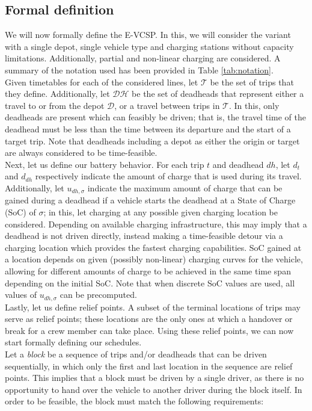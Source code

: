 \documentclass[]{article}
\begin{document}
\subsection{Formal definition}
We will now formally define the E-VCSP. In this, we will consider the variant with a single depot, single vehicle type and charging stations without capacity limitations. Additionally, partial and non-linear charging are considered. A summary of the notation used has been provided in Table \ref{tab:notation}. \\
Given timetables for each of the considered lines, let $\mathcal{T}$ be the set of trips that they define. Additionally, let $\mathcal{DH}$ be the set of deadheads that represent either a travel to or from the depot $\mathcal{D}$, or a travel between trips in $\mathcal{T}$. In this, only deadheads are present which can feasibly be driven; that is, the travel time of the deadhead must be less than the time between its departure and the start of a target trip. Note that deadheads including a depot as either the origin or target are always considered to be time-feasible. \\ 
Next, let us define our battery behavior. For each trip $t$ and deadhead $dh$, let $d_t$ and $d_{dh}$ respectively indicate the amount of charge that is used during its travel. Additionally, let $u_{dh,\sigma}$ indicate the maximum amount of charge that can be gained during a deadhead if a vehicle starts the deadhead at a State of Charge (SoC) of $\sigma$; in this, let charging at any possible given charging location be considered. Depending on available charging infrastructure, this may imply that a deadhead is not driven directly, instead making a time-feasible detour via a charging location which provides the fastest charging capabilities. SoC gained at a location depends on given (possibly non-linear) charging curves for the vehicle, allowing for different amounts of charge to be achieved in the same time span depending on the initial SoC. Note that when discrete SoC values are used, all values of $u_{dh,\sigma}$ can be precomputed. \\
Lastly, let us define relief points. A subset of the terminal locations of trips may serve as relief points; these locations are the only ones at which a handover or break for a crew member can take place. Using these relief points, we can now start formally defining our schedules.\\
Let a \textit{block} be a sequence of trips and/or deadheads that can be driven sequentially, in which only the first and last location in the sequence are relief points. This implies that a block must be driven by a single driver, as there is no opportunity to hand over the vehicle to another driver during the block itself. In order to be feasible, the block must match the following requirements: 
\end{document}
